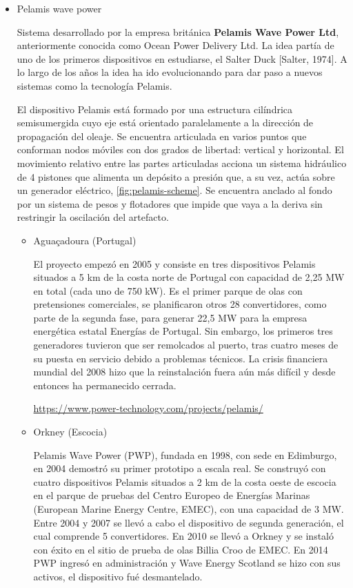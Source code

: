 \begin{itemize}
\item
  Pelamis wave power

  Sistema desarrollado por la empresa británica \textbf{Pelamis Wave
  Power Ltd}, anteriormente conocida como Ocean Power Delivery Ltd. La
  idea partía de uno de los primeros dispositivos en estudiarse, el
  Salter Duck {[}Salter, 1974{]}. A lo largo de los años la idea ha ido
  evolucionando para dar paso a nuevos sistemas como la tecnología
  Pelamis.

  El dispositivo Pelamis está formado por una estructura cilíndrica
  semisumergida cuyo eje está orientado paralelamente a la dirección de
  propagación del oleaje. Se encuentra articulada en varios puntos que
  conforman nodos móviles con dos grados de libertad: vertical y
  horizontal. El movimiento relativo entre las partes articuladas
  acciona un sistema hidráulico de 4 pistones que alimenta un depósito a
  presión que, a su vez, actúa sobre un generador eléctrico, \autoref{fig:pelamis-scheme}. Se
  encuentra anclado al fondo por un sistema de pesos y flotadores que
  impide que vaya a la deriva sin restringir la oscilación del
  artefacto.



  \begin{itemize}
  \item
    Aguaçadoura (Portugal)

    El proyecto empezó en 2005 y consiste en tres dispositivos Pelamis
    situados a 5 km de la costa norte de Portugal con capacidad de 2,25
    MW en total (cada uno de 750 kW). Es el primer parque de olas con
    pretensiones comerciales, se planificaron otros 28 convertidores,
    como parte de la segunda fase, para generar 22,5 MW para la empresa
    energética estatal Energías de Portugal. Sin embargo, los primeros
    tres generadores tuvieron que ser remolcados al puerto, tras cuatro
    meses de su puesta en servicio debido a problemas técnicos. La
    crisis financiera mundial del 2008 hizo que la reinstalación fuera
    aún más difícil y desde entonces ha permanecido cerrada.

    \url{https://www.power-technology.com/projects/pelamis/}
  \item
    Orkney (Escocia)

    Pelamis Wave Power (PWP), fundada en 1998, con sede en Edimburgo, en
    2004 demostró su primer prototipo a escala real. Se construyó con
    cuatro dispositivos Pelamis situados a 2 km de la costa oeste de
    escocia en el parque de pruebas del Centro Europeo de Energías
    Marinas (European Marine Energy Centre, EMEC), con una capacidad de
    3 MW. Entre 2004 y 2007 se llevó a cabo el dispositivo de segunda
    generación, el cual comprende 5 convertidores. En 2010 se llevó a
    Orkney y se instaló con éxito en el sitio de prueba de olas Billia
    Croo de EMEC. En 2014 PWP ingresó en administración y Wave Energy
    Scotland se hizo con sus activos, el dispositivo fué desmantelado.


\end{itemize}
\end{itemize}

